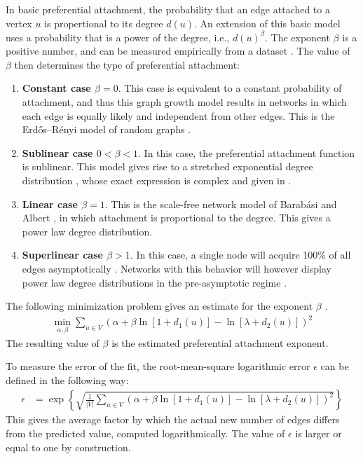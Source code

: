 \documentclass{article}
\begin{document}
In basic preferential attachment, the probability that an edge
attached to a vertex $u$ is propertional to its degree $d(u)$.  An
extension of this basic model uses a probability that is a power of the
degree, i.e., $d(u)^\beta$.  The exponent $\beta$ is a positive number,
and can be measured empirically from a dataset
\citep{kunegis:preferential-attachment}.  The value of $\beta$ then
determines the type of preferential attachment:
\begin{enumerate}
\item \textbf{Constant case $\beta=0$}.  
This case is equivalent to a constant probability of attachment, 
and thus this graph growth model results in networks in which each edge
is equally likely and independent from other edges.  This is the
Erdős--Rényi model of random graphs \citep{b569}. 

\item \textbf{Sublinear case $0 < \beta < 1$}. 
In this case, the preferential attachment function is sublinear.  This
model gives rise to a stretched exponential degree distribution
\citep{b764}, whose exact 
expression is complex and given in \citep[Eq. 94]{b773}. 

\item \textbf{Linear case $\beta=1$}.
This is the scale-free network model of Barabási and Albert
\citep{b439}, in which attachment is proportional to the degree. This gives a
power law degree distribution.  

\item \textbf{Superlinear case $\beta > 1$}.
In this case, a single node will acquire 100\% of all edges
asymptotically \citep{b765}. Networks with this behavior will however display
power law degree distributions in the pre-asymptotic regime
\citep{b769}. 
\end{enumerate}

The following minimization problem gives an estimate for the exponent
$\beta$ \citep{kunegis:preferential-attachment}.
\begin{align}
  \min_{\alpha,\beta} \sum_{u\in V} \left( \alpha + \beta \ln[1 + d_1(u)]
  - \ln[\lambda + d_2(u)]  \right)^2
  \label{eq:min}
\end{align}
The resulting value of $\beta$ is the estimated preferential attachment
exponent. 

To measure the error of the fit, the root-mean-square
logarithmic error $\epsilon$ can be defined in the following way: 
\begin{align*}
    \epsilon &= \exp\left\{ \sqrt{ \frac 1 {|V|} \sum_{u \in V}
      \left(\alpha + \beta \ln[1 
        + d_1(u)] - \ln[\lambda + d_2(u)]\right)^2  }  \right\}
\end{align*}
This gives the average factor by which the actual new number of edges
differs from the predicted value, computed logarithmically. 
The value of $\epsilon$ is larger or equal to one by construction. 
\end{document}
